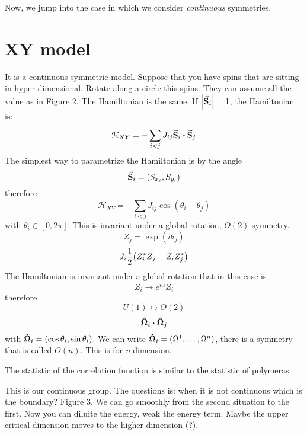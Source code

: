 \documentclass[../main/main.tex]{subfiles}
\begin{document}
Now, we jump into the case in which we consider \emph{continuous} symmetries.
\section{XY model}
It is a continuous symmetric model. Suppose that you have spins that are sitting in hyper dimensional. Rotate along a circle this spins. They can assume all the value as in Figure 2. The Hamiltonian is the same. If \( \abs{\va{S}_i} =1  \), the Hamiltonian is:
\begin{equation}
  \mathcal{H}_{XY} = - \sum_{i<j}^{} J_{ij} \va{S}_i \vdot \va{S}_j
\end{equation}
The simplest way to parametrize the Hamiltonian is by the angle
\begin{equation}
  \va{S}_i = (S_{x_i}, S_{y_i})
\end{equation}
therefore
\begin{equation}
  \mathcal{H}_{XY} = - \sum_{i<j}^{} J_{ij} \cos(\theta _i - \theta _j)
\end{equation}
with \( \theta _i \in [0,2 \pi ] \).
This is invariant under a global rotation, \( O(2) \) symmetry.
\begin{equation}
  Z_j = \exp (i \theta _j)
\end{equation}
\begin{equation}
J_i  \frac{1}{2} \qty(Z_i^* Z_j + Z_i Z_j^*)
\end{equation}
The Hamiltonian is invariant under a global rotation that in this case is
\begin{equation}
  Z_i \rightarrow e^{i \alpha } Z_i
\end{equation}
therefore
\begin{equation}
  U(1) \leftrightarrow O(2)
\end{equation}
\begin{equation}
  \vu{\Omega }_i \vdot \vu{\Omega }_j
\end{equation}
with \( \vu{\Omega }_i = ( \cos \theta _i, \sin \theta _i) \).
We can write \( \vu{\Omega }_i = ( \Omega ^1, \dots, \Omega ^n) \), there is a symmetry that is called \( O(n) \). This is for \emph{n} dimension.

The statistic of the correlation function is similar to the statistic of polymeras.

This is our continuous group. The questions is: when it is not continuous which is the boundary?  Figure 3. We can go smoothly from the second situation to the first. Now you can diluite the energy, weak the energy term. Maybe the upper critical  dimension moves to the higher dimension (?).
\end{document}
